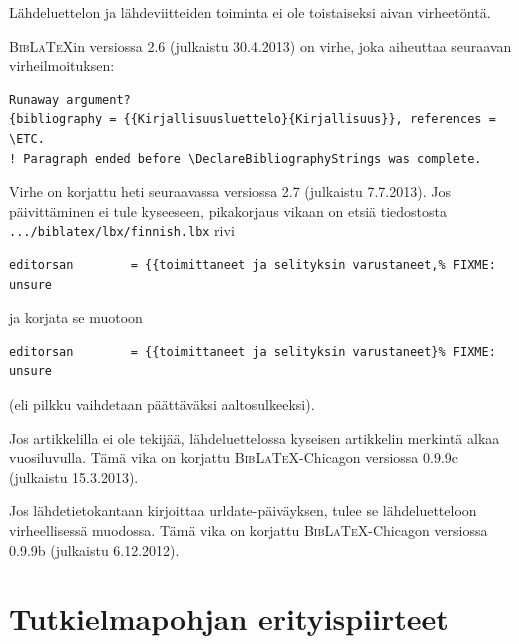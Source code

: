 \documentclass[utf8]{gradu3}
\begin{document}
Lähdeluettelon ja lähdeviitteiden toiminta ei ole toistaiseksi aivan
virheetöntä.

\textsc{Bib\LaTeX}in versiossa 2.6 (julkaistu 30.4.2013) on virhe,
joka aiheuttaa seuraavan virheilmoituksen:%
{\footnotesize%
\begin{verbatim}
Runaway argument?
{bibliography = {{Kirjallisuusluettelo}{Kirjallisuus}}, references = \ETC.
! Paragraph ended before \DeclareBibliographyStrings was complete.
\end{verbatim}
}%
Virhe on korjattu heti seuraavassa versiossa 2.7 (julkaistu 7.7.2013).
Jos päivittäminen ei tule kyseeseen, pikakorjaus vikaan on etsiä
tiedostosta \texttt{.../biblatex/lbx/finnish.lbx} rivi%
{\footnotesize%
\begin{verbatim}
editorsan        = {{toimittaneet ja selityksin varustaneet,% FIXME: unsure
\end{verbatim}
}%
ja korjata se muotoon%
{\footnotesize%
\begin{verbatim}
editorsan        = {{toimittaneet ja selityksin varustaneet}% FIXME: unsure
\end{verbatim}
}%
(eli pilkku vaihdetaan päättäväksi aaltosulkeeksi).

Jos artikkelilla ei ole tekijää, lähdeluettelossa kyseisen artikkelin
merkintä alkaa vuosiluvulla.  Tämä vika on korjattu
\textsc{Bib\LaTeX}-Chicagon versiossa 0.9.9c (julkaistu 15.3.2013).

Jos lähdetietokantaan kirjoittaa urldate-päiväyksen, tulee se
lähdeluetteloon virheellisessä muodossa.  Tämä vika on korjattu
\textsc{Bib\LaTeX}-Chicagon versiossa 0.9.9b (julkaistu 6.12.2012).

\chapter{Tutkielmapohjan erityispiirteet}
\end{document}
